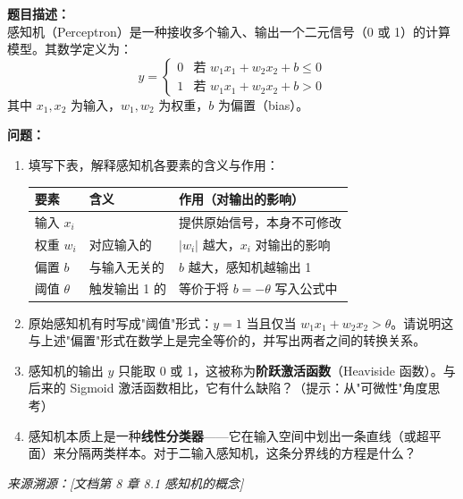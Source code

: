 \documentclass[a4paper,11pt]{ctexart}
\begin{document}
\begin{problembox}
    \textbf{题目描述：}\\
    感知机（Perceptron）是一种接收多个输入、输出一个二元信号（0 或 1）的计算模型。其数学定义为：
    \[
    y = \begin{cases} 0 & \text{若 } w_1 x_1 + w_2 x_2 + b \leq 0 \\ 1 & \text{若 } w_1 x_1 + w_2 x_2 + b > 0 \end{cases}
    \]
    其中 $x_1, x_2$ 为输入，$w_1, w_2$ 为权重，$b$ 为偏置（bias）。

    \vspace{0.3cm}
    \textbf{问题：}
    \begin{enumerate}[(1)]
        \item 填写下表，解释感知机各要素的含义与作用：

        \begin{center}
        \begin{tabular}{p{2.5cm} p{4.5cm} p{5cm}}
            \toprule
            要素 & 含义 & 作用（对输出的影响） \\
            \midrule
            输入 $x_i$ & \underline{\hspace{4cm}} & 提供原始信号，本身不可修改 \\[1.5em]
            权重 $w_i$ & 对应输入的\underline{\hspace{2.5cm}} & $|w_i|$ 越大，$x_i$ 对输出的影响\underline{\hspace{1cm}} \\[1.5em]
            偏置 $b$ & 与输入无关的\underline{\hspace{2cm}} & $b$ 越大，感知机越\underline{\hspace{1.5cm}}输出 1 \\[1.5em]
            阈值 $\theta$ & 触发输出 1 的\underline{\hspace{2cm}} & 等价于将 $b = -\theta$ 写入公式中 \\
            \bottomrule
        \end{tabular}
        \end{center}

        \item 原始感知机有时写成"阈值"形式：$y=1$ 当且仅当 $w_1 x_1 + w_2 x_2 > \theta$。请说明这与上述"偏置"形式在数学上是完全等价的，并写出两者之间的转换关系。

        \item 感知机的输出 $y$ 只能取 0 或 1，这被称为\textbf{阶跃激活函数}（Heaviside 函数）。与后来的 Sigmoid 激活函数相比，它有什么缺陷？（提示：从"可微性"角度思考）

        \item 感知机本质上是一种\textbf{线性分类器}——它在输入空间中划出一条直线（或超平面）来分隔两类样本。对于二输入感知机，这条分界线的方程是什么？
    \end{enumerate}

    \vspace{0.2cm}
    {\color{gray}\small\textit{来源溯源：[文档第 8 章 8.1 感知机的概念]}}
\end{problembox}
\end{document}
